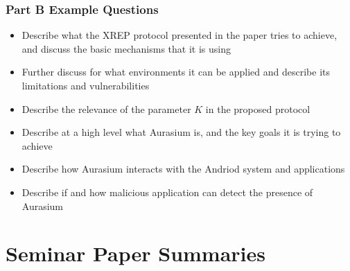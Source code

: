 \documentclass[12pt, a4paper]{article}
\begin{document}
\subsubsection{Part B Example Questions}
\begin{itemize}
	\item Describe what the XREP protocol presented in the paper tries to achieve, and discuss the basic mechanisms that it is using
	\item Further discuss for what environments it can be applied and describe its limitations and vulnerabilities
	\item Describe the relevance of the parameter $K$ in the proposed protocol
	\item Describe at a high level what Aurasium is, and the key goals it is trying to achieve
	\item Describe how Aurasium interacts with the Andriod system and applications
	\item Describe if and how malicious application can detect the presence of Aurasium
\end{itemize}

\pagebreak
\section{Seminar Paper Summaries}





\end{document}
